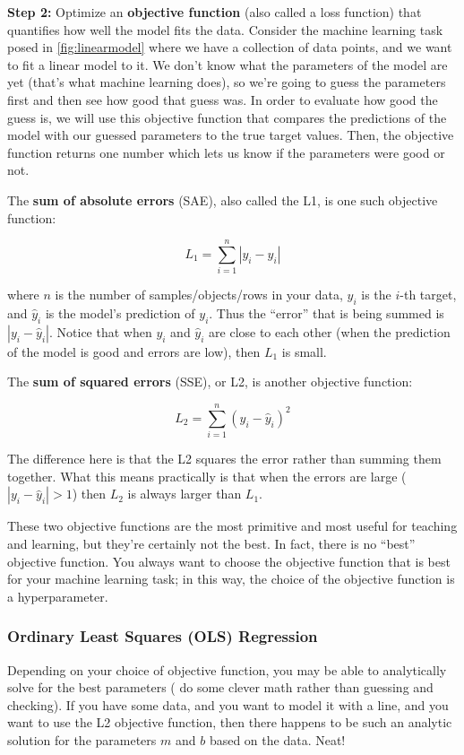 \textbf{Step 2:} Optimize an \textbf{objective function} (also called a loss function) that quantifies how well the model fits the data. Consider the machine learning task posed in \autoref{fig:linearmodel} where we have a collection of data points, and we want to fit a linear model to it. We don't know what the parameters of the model are yet (that's what machine learning does), so we're going to guess the parameters first and then see how good that guess was. In order to evaluate how good the guess is, we will use this objective function that compares the predictions of the model with our guessed parameters to the true target values. Then, the objective function returns one number which lets us know if the parameters were good or not.

The \textbf{sum of absolute errors} (SAE), also called the L1, is one such objective function:

\begin{equation}
    L_1 = \sum_{i=1}^n |y_i - \hat{y}_i|
\end{equation}

\noindent where $n$ is the number of samples/objects/rows in your data, $y_i$ is the $i$-th target, and $\hat{y}_i$ is the model's prediction of $y_i$. Thus the ``error'' that is being summed is $|y_i - \hat{y}_i|$. Notice that when $y_i$ and $\hat{y}_i$ are close to each other (when the prediction of the model is good and errors are low), then $L_1$ is small.

The \textbf{sum of squared errors} (SSE), or L2, is another objective function:

\begin{equation}
    L_2 = \sum_{i=1}^n (y_i - \hat{y}_i)^2
\end{equation}

\noindent The difference here is that the L2 squares the error rather than summing them together. What this means practically is that when the errors are large (\ie{} $|y_i-\hat{y}_i|>1$) then $L_2$ is always larger than $L_1$.

These two objective functions are the most primitive and most useful for teaching and learning, but they're certainly not the best. In fact, there is no ``best'' objective function. You always want to choose the objective function that is best for your machine learning task; in this way, the choice of the objective function is a hyperparameter.

\subsubsection*{Ordinary Least Squares (OLS) Regression}
Depending on your choice of objective function, you may be able to analytically solve for the best parameters (\ie{} do some clever math rather than guessing and checking). If you have some data, and you want to model it with a line, and you want to use the L2 objective function, then there happens to be such an analytic solution for the parameters $m$ and $b$ based on the data. Neat!

